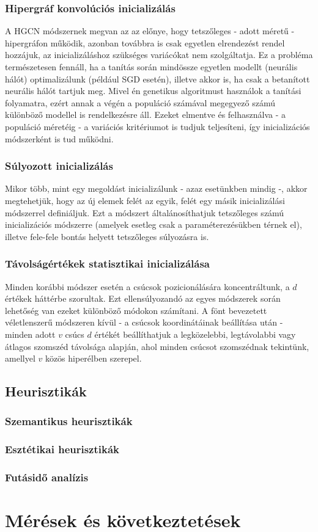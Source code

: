 \subsubsection{Hipergráf konvolúciós inicializálás}

A HGCN módszernek megvan az az előnye, hogy tetszőleges - adott méretű - hipergráfon működik, azonban továbbra is csak egyetlen elrendezést rendel hozzájuk, az inicializáláshoz szükséges variácókat nem szolgáltatja. Ez a probléma természetesen fennáll, ha a tanítás során mindössze egyetlen modellt (neurális hálót) optimalizálunk (például SGD esetén), illetve akkor is, ha csak a betanított neurális hálót tartjuk meg. Mivel én genetikus algoritmust használok a tanítási folyamatra, ezért annak a végén a populáció számával megegyező számú különböző modellel is rendelkezésre áll. Ezeket elmentve és felhasználva - a populáció méretéig - a variációs kritériumot is tudjuk teljesíteni, így inicializációs módszerként is tud működni.

\subsubsection{Súlyozott inicializálás}

Mikor több, mint egy megoldást inicializálunk - azaz esetünkben mindig -, akkor megtehetjük, hogy az új elemek felét az egyik, felét egy másik inicializálási módszerrel definiáljuk. Ezt a módszert általánosíthatjuk tetszőleges számú inicializációs módszerre (amelyek esetleg csak a paraméterezésükben térnek el), illetve fele-fele bontás helyett tetszőleges súlyozásra is.


\subsubsection{Távolságértékek statisztikai inicializálása}

Minden korábbi módszer esetén a csúcsok pozicionálására koncentráltunk, a $d$ értékek háttérbe szorultak. Ezt ellensúlyozandó az egyes módszerek során lehetőség van ezeket különböző módokon számítani. A fönt bevezetett véletlenszerű módszeren kívül - a csúcsok koordinátáinak beállítása után - minden adott $v$ csúcs $d$ értékét beállíthatjuk a legközelebbi, legtávolabbi vagy átlagos szomszéd távolsága alapján, ahol minden csúcsot szomszédnak tekintünk, amellyel $v$ közös hiperélben szerepel.





\subsection{Heurisztikák} \label{heuristics}
\subsubsection{Szemantikus heurisztikák}
\subsubsection{Esztétikai heurisztikák}
\subsubsection{Futásidő analízis}

\section{Mérések és következtetések}

